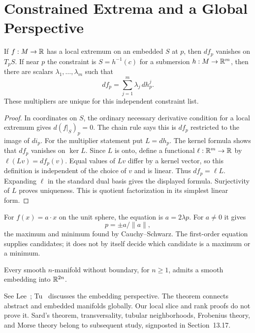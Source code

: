 \section{Constrained Extrema and a Global Perspective}
\begin{proposition}\label{prop:intrinsic-multipliers}
If $f:M\to\mathbb{R}$ has a local extremum on an embedded $S$ at $p$, then
$df_p$ vanishes on $T_pS$. If near $p$ the constraint is
$S=h^{-1}(c)$ for a submersion $h:M\to\mathbb{R}^m$, then there are scalars
$\lambda_1,\ldots,\lambda_m$ such that
\[
df_p=\sum_{j=1}^m\lambda_j\,dh^j_p.
\]
These multipliers are unique for this independent constraint list.
\end{proposition}
\begin{proof}
In coordinates on $S$, the ordinary necessary derivative condition for a
local extremum gives $d(f|_S)_p=0$. The chain rule says this is $df_p$
restricted to the image of $di_p$.
For the multiplier statement put $L=dh_p$. The kernel formula shows that
$df_p$ vanishes on $\ker L$. Since $L$ is onto, define a functional
$\ell:\mathbb{R}^m\to\mathbb{R}$ by $\ell(Lv)=df_p(v)$. Equal values of $Lv$ differ
by a kernel vector, so this definition is independent of the choice of
$v$ and is linear. Thus $df_p=\ell L$. Expanding $\ell$ in the standard
dual basis gives the displayed formula. Surjectivity of $L$ proves
uniqueness. This is quotient factorization in its simplest linear form.
\end{proof}
For $f(x)=a\cdot x$ on the unit sphere, the equation is $a=2\lambda p$.
For $a\ne0$ it gives
\[
p=\pm a/\|a\|,
\]
 the maximum and minimum found by
Cauchy--Schwarz. The first-order equation supplies candidates; it does not
by itself decide which candidate is a maximum or a minimum.

\begin{theorem}
Every smooth $n$-manifold without boundary, for $n\geq1$, admits a smooth
embedding into $\mathbb{R}^{2n}$.
\end{theorem}
See Lee~\cite[Theorem 6.19]{lee-smooth}; Tu~\cite[\S11.3]{tu-manifolds}
discusses the embedding perspective. The theorem connects abstract and
embedded manifolds globally. Our local slice and rank proofs do not prove
it. Sard's theorem, transversality, tubular neighborhoods, Frobenius theory,
and Morse theory belong to subsequent study, signposted in Section~13.17.

